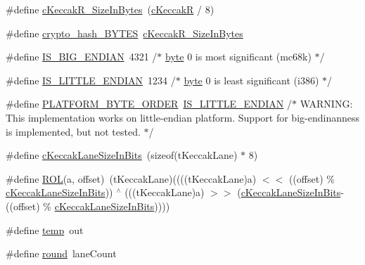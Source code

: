 \begin{DoxyCompactItemize}
\item 
\#define \hyperlink{Keccak-compact_8c_ad6082b5565384a6caf3ec77eba2e8568}{c\-Keccak\-R\-\_\-\-Size\-In\-Bytes}~(\hyperlink{Keccak-compact-settings_8h_a5fc5899c67f1a4fdaa0a268ffae677bf}{c\-Keccak\-R} / 8)
\item 
\#define \hyperlink{Keccak-compact_8c_a66cae38ae55f1b947696d9099b5c3087}{crypto\-\_\-hash\-\_\-\-B\-Y\-T\-E\-S}~\hyperlink{Keccak-compact_8c_ad6082b5565384a6caf3ec77eba2e8568}{c\-Keccak\-R\-\_\-\-Size\-In\-Bytes}
\item 
\#define \hyperlink{Keccak-compact_8c_a0fdc6fe49d3e76c9ed558321df1decef}{I\-S\-\_\-\-B\-I\-G\-\_\-\-E\-N\-D\-I\-A\-N}~4321 /$\ast$ \hyperlink{types_8h_a0c8186d9b9b7880309c27230bbb5e69d}{byte} 0 is most significant (mc68k) $\ast$/
\item 
\#define \hyperlink{Keccak-compact_8c_a30f87dfd7349d5165f116b550c35c6ed}{I\-S\-\_\-\-L\-I\-T\-T\-L\-E\-\_\-\-E\-N\-D\-I\-A\-N}~1234 /$\ast$ \hyperlink{types_8h_a0c8186d9b9b7880309c27230bbb5e69d}{byte} 0 is least significant (i386) $\ast$/
\item 
\#define \hyperlink{Keccak-compact_8c_af1fc6f24fa4e3d41f5e584cfed2c88dd}{P\-L\-A\-T\-F\-O\-R\-M\-\_\-\-B\-Y\-T\-E\-\_\-\-O\-R\-D\-E\-R}~\hyperlink{Keccak-compact_8c_a30f87dfd7349d5165f116b550c35c6ed}{I\-S\-\_\-\-L\-I\-T\-T\-L\-E\-\_\-\-E\-N\-D\-I\-A\-N} /$\ast$ W\-A\-R\-N\-I\-N\-G\-: This implementation works on little-\/endian platform. Support for big-\/endinanness is implemented, but not tested. $\ast$/
\item 
\#define \hyperlink{Keccak-compact_8c_aa8261644be5dfc79cb192506a4e4e6dc}{c\-Keccak\-Lane\-Size\-In\-Bits}~(sizeof(t\-Keccak\-Lane) $\ast$ 8)
\item 
\#define \hyperlink{Keccak-compact_8c_aec7a6f8049659733c0c5aac28df4abe2}{R\-O\-L}(a, offset)~(t\-Keccak\-Lane)((((t\-Keccak\-Lane)a) $<$$<$ ((offset) \% \hyperlink{Keccak-compact_8c_aa8261644be5dfc79cb192506a4e4e6dc}{c\-Keccak\-Lane\-Size\-In\-Bits})) $^\wedge$ (((t\-Keccak\-Lane)a) $>$$>$ (\hyperlink{Keccak-compact_8c_aa8261644be5dfc79cb192506a4e4e6dc}{c\-Keccak\-Lane\-Size\-In\-Bits}-\/((offset) \% \hyperlink{Keccak-compact_8c_aa8261644be5dfc79cb192506a4e4e6dc}{c\-Keccak\-Lane\-Size\-In\-Bits}))))
\item 
\#define \hyperlink{Keccak-compact_8c_a5905d48604152cf57aa6bfa087b49173}{temp}~out
\item 
\#define \hyperlink{Keccak-compact_8c_a391a6101dbe52ca4c7a42f8b74541e14}{round}~lane\-Count
\end{DoxyCompactItemize}

